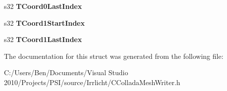 \begin{DoxyCompactItemize}
\item 
\hypertarget{structirr_1_1scene_1_1_c_collada_mesh_writer_1_1_s_component_global_start_pos_a0ef73a321722b7ce1ed9c859cc7da3e2}{s32 {\bfseries T\-Coord0\-Last\-Index}}\label{structirr_1_1scene_1_1_c_collada_mesh_writer_1_1_s_component_global_start_pos_a0ef73a321722b7ce1ed9c859cc7da3e2}

\item 
\hypertarget{structirr_1_1scene_1_1_c_collada_mesh_writer_1_1_s_component_global_start_pos_a429a9a8b406c268042f98ef8b0f61d3e}{s32 {\bfseries T\-Coord1\-Start\-Index}}\label{structirr_1_1scene_1_1_c_collada_mesh_writer_1_1_s_component_global_start_pos_a429a9a8b406c268042f98ef8b0f61d3e}

\item 
\hypertarget{structirr_1_1scene_1_1_c_collada_mesh_writer_1_1_s_component_global_start_pos_ab757558bb0269b5cffe7a205d1b81a03}{s32 {\bfseries T\-Coord1\-Last\-Index}}\label{structirr_1_1scene_1_1_c_collada_mesh_writer_1_1_s_component_global_start_pos_ab757558bb0269b5cffe7a205d1b81a03}

\end{DoxyCompactItemize}


The documentation for this struct was generated from the following file\-:\begin{DoxyCompactItemize}
\item 
C\-:/\-Users/\-Ben/\-Documents/\-Visual Studio 2010/\-Projects/\-P\-S\-I/source/\-Irrlicht/C\-Collada\-Mesh\-Writer.\-h\end{DoxyCompactItemize}
